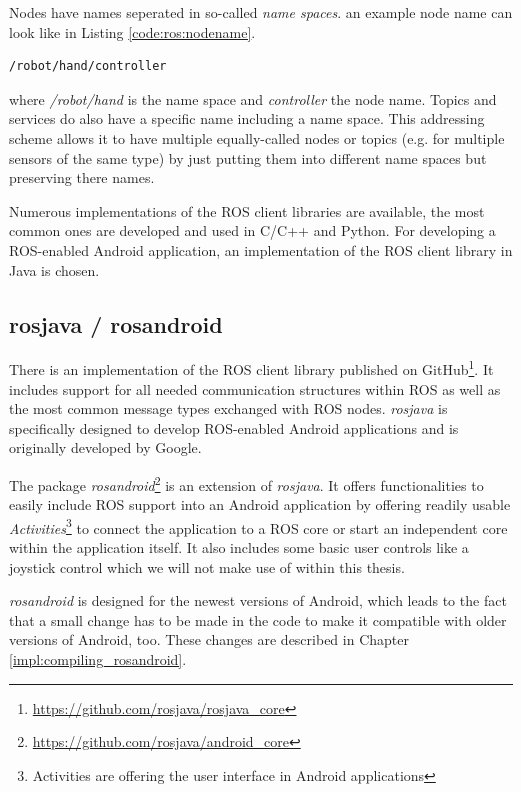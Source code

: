 Nodes have names seperated in so-called \textit{name spaces}. an example node name can look like in Listing \ref{code:ros:nodename}.
\begin{lstlisting}[caption={An example ROS node name},label=code:ros:nodename]
/robot/hand/controller
\end{lstlisting}


where \textit{/robot/hand} is the name space and \textit{controller} the node name. Topics and services do also have a specific name including a name space. This addressing scheme allows it to have multiple equally-called nodes or topics (e.g. for multiple sensors of the same type) by just putting them into different name spaces but preserving there names.

Numerous implementations of the ROS client libraries are available, the most common ones are developed and used in C/C++ and Python\cite{ros:client_libraries}. For developing a ROS-enabled Android application, an implementation of the ROS client library in Java is chosen. 

\subsection{rosjava / rosandroid}

There is an implementation of the ROS client library published on GitHub\footnote{\url{https://github.com/rosjava/rosjava_core}}. It includes support for all needed communication structures within ROS as well as the most common message types exchanged with ROS nodes. \textit{rosjava} is specifically designed to develop ROS-enabled Android applications and is originally developed by Google\cite{ros:rosjava:readme}.

The package \textit{rosandroid}\footnote{\url{https://github.com/rosjava/android_core}} is an extension of \textit{rosjava}. It offers functionalities to easily include ROS support into an Android application by offering readily usable \textit{Activities}\footnote{Activities are offering the user interface in Android applications} to connect the application to a ROS core or start an independent core within the application itself. It also includes some basic user controls like a joystick control which we will not make use of within this thesis.

\textit{rosandroid} is designed for the newest versions of Android, which leads to the fact that a small change has to be made in the code to make it compatible with older versions of Android, too. These changes are described in Chapter \ref{impl:compiling_rosandroid}.


